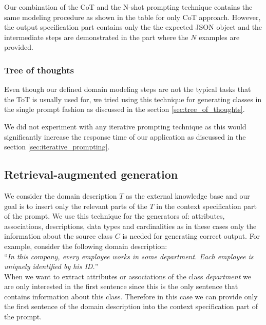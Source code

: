 Our combination of the CoT and the N-shot prompting technique contains the same modeling procedure as shown in the table for only CoT approach. However, the output specification part contains only the the expected JSON object and the intermediate steps are demonstrated in the part where the $N$ examples are provided.


\subsubsection{Tree of thoughts}

Even though our defined domain modeling steps are not the typical tasks that the ToT is usually used for, we tried using this technique for generating classes in the single prompt fashion as discussed in the section \ref{sec:tree_of_thoughts}.

We did not experiment with any iterative prompting technique as this would significantly increase the response time of our application as discussed in the section \ref{sec:iterative_prompting}.



\subsection{Retrieval-augmented generation}

We consider the domain description $T$ as the external knowledge base and our goal is to insert only the relevant parts of the $T$ in the context specification part of the prompt. We use this technique for the generators of: attributes, associations, descriptions, data types and cardinalities as in these cases only the information about the source class $C$ is needed for generating correct output. For example, consider the following domain description: \\

\noindent{}``\textit{In this company, every employee works in some department. Each employee is uniquely identified by his ID.}''\\

\noindent{}When we want to extract attributes or associations of the class \textit{department} we are only interested in the first sentence since this is the only sentence that contains information about this class. Therefore in this case we can provide only the first sentence of the domain description into the context specification part of the prompt.

